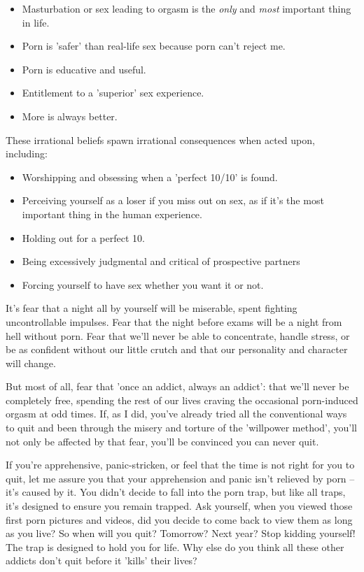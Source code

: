\documentclass[
]{book}
\begin{document}
\begin{itemize}
\item
  Masturbation or sex leading to orgasm is the \emph{only} and \emph{most} important thing in life.
\item
  Porn is 'safer' than real-life sex because porn can't reject me.
\item
  Porn is educative and useful.
\item
  Entitlement to a 'superior' sex experience.
\item
  More is always better.
\end{itemize}

These irrational beliefs spawn irrational consequences when acted upon, including:

\begin{itemize}
\item
  Worshipping and obsessing when a 'perfect 10/10' is found.
\item
  Perceiving yourself as a loser if you miss out on sex, as if it's the most important thing in the human experience.
\item
  Holding out for a perfect 10.
\item
  Being excessively judgmental and critical of prospective partners
\item
  Forcing yourself to have sex whether you want it or not.
\end{itemize}

It's fear that a night all by yourself will be miserable, spent fighting uncontrollable impulses. Fear that the night before exams will be a night from hell without porn. Fear that we'll never be able to concentrate, handle stress, or be as confident without our little crutch and that our personality and character will change.

But most of all, fear that 'once an addict, always an addict': that we'll never be completely free, spending the rest of our lives craving the occasional porn-induced orgasm at odd times. If, as I did, you've already tried all the conventional ways to quit and been through the misery and torture of the 'willpower method', you'll not only be affected by that fear, you'll be convinced you can never quit.

If you're apprehensive, panic-stricken, or feel that the time is not right for you to quit, let me assure you that your apprehension and panic isn't relieved by porn -- it's caused by it. You didn't decide to fall into the porn trap, but like all traps, it's designed to ensure you remain trapped. Ask yourself, when you viewed those first porn pictures and videos, did you decide to come back to view them as long as you live? So when will you quit? Tomorrow? Next year? Stop kidding yourself! The trap is designed to hold you for life. Why else do you think all these other addicts don't quit before it 'kills' their lives?
\end{document}
